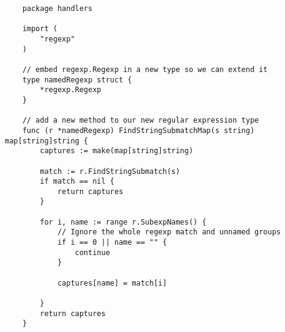 
\begin{verbatim}
    package handlers
    
    import (
        "regexp"
    )
    
    // embed regexp.Regexp in a new type so we can extend it
    type namedRegexp struct {
        *regexp.Regexp
    }
    
    // add a new method to our new regular expression type
    func (r *namedRegexp) FindStringSubmatchMap(s string) map[string]string {
        captures := make(map[string]string)
    
        match := r.FindStringSubmatch(s)
        if match == nil {
            return captures
        }
    
        for i, name := range r.SubexpNames() {
            // Ignore the whole regexp match and unnamed groups
            if i == 0 || name == "" {
                continue
            }
    
            captures[name] = match[i]
    
        }
        return captures
    }    
\end{verbatim}



